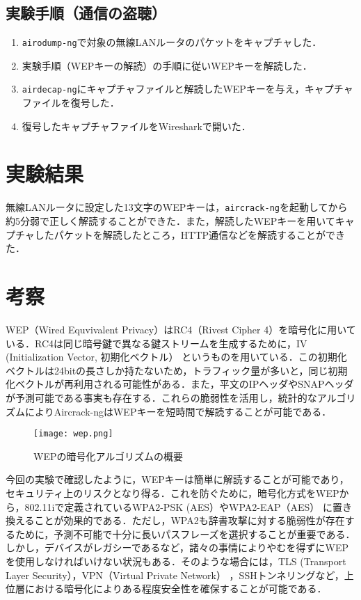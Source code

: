\subsection{実験手順（通信の盗聴）}

\begin{enumerate}
\def\labelenumi{\arabic{enumi}.}
\itemsep1pt\parskip0pt
\item
  \texttt{airodump-ng}で対象の無線LANルータのパケットをキャプチャした．
\item
  実験手順（WEPキーの解読）の手順に従いWEPキーを解読した．
\item
  \texttt{airdecap-ng}にキャプチャファイルと解読したWEPキーを与え，キャプチャファイルを復号した．
\item
  復号したキャプチャファイルをWiresharkで開いた．
\end{enumerate}

\section{実験結果}

無線LANルータに設定した13文字のWEPキーは，\texttt{aircrack-ng}を起動してから約5分弱で正しく解読することができた．また，解読したWEPキーを用いてキャプチャしたパケットを解読したところ，HTTP通信などを解読することができた．

\section{考察}

WEP（Wired Equvivalent Privacy）はRC4（Rivest Cipher
4）を暗号化に用いている．RC4は同じ暗号鍵で異なる鍵ストリームを生成するために，IV
(Initialization Vector, 初期化ベクトル）
というものを用いている．この初期化ベクトルは24bitの長さしか持たないため，トラフィック量が多いと，同じ初期化ベクトルが再利用される可能性がある．また，平文のIPヘッダやSNAPヘッダが予測可能である事実も存在する．これらの脆弱性を活用し，統計的なアルゴリズムによりAircrack-ngはWEPキーを短時間で解読することが可能である．

\begin{figure}[htbp]
    \begin{center}
        \texttt{[image: wep.png]}
    \end{center}
    \caption{WEPの暗号化アルゴリズムの概要}
\end{figure}

今回の実験で確認したように，WEPキーは簡単に解読することが可能であり，セキュリティ上のリスクとなり得る．これを防ぐために，暗号化方式をWEPから，802.11iで定義されているWPA2-PSK
(AES）やWPA2-EAP（AES）
に置き換えることが効果的である．ただし，WPA2も辞書攻撃に対する脆弱性が存在するために，予測不可能で十分に長いパスフレーズを選択することが重要である．しかし，デバイスがレガシーであるなど，諸々の事情によりやむを得ずにWEPを使用しなければいけない状況もある．そのような場合には，TLS
(Transport Layer Security），VPN（Virtual Private Network）
，SSHトンネリングなど，上位層における暗号化によりある程度安全性を確保することが可能である．
